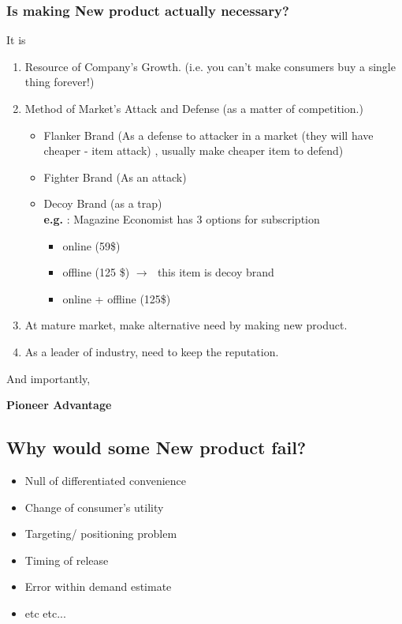 \documentclass[12pt]{article}
\newcommand{\ra}{$\rightarrow \text{ }$}
\newcommand{\tb}{\textbf}
\begin{document}
\subsubsection{Is making New product actually necessary?}
It is
\begin{enumerate}
	\item Resource of Company's Growth. (i.e. you can't make consumers buy a single thing forever!)
	\item Method of Market's Attack and Defense (as a matter of competition.) \\
	\begin{itemize}
		\item Flanker Brand (As a defense to attacker in a market (they will have cheaper - item attack) , usually make cheaper item to defend)
		\item Fighter Brand (As an attack)
		\item Decoy Brand (as a trap) \\
		\tb{e.g.} : Magazine Economist has 3 options for subscription
		\begin{itemize}
			\item online (59\$)
			\item offline (125 \$) \ra this item is decoy brand
			\item online + offline (125\$)
		\end{itemize}
	\end{itemize}
	\item At mature market, make alternative need by making new product.
	\item As a leader of industry, need to keep the reputation.
\end{enumerate}
And importantly,

\textbf{Pioneer Advantage}

\subsection{Why would some New product fail?}
\begin{itemize}
	\item Null of differentiated convenience
	\item Change of consumer's utility
	\item Targeting/ positioning problem
	\item Timing of release
	\item Error within demand estimate
	\item etc etc...
\end{itemize}
\end{document}
